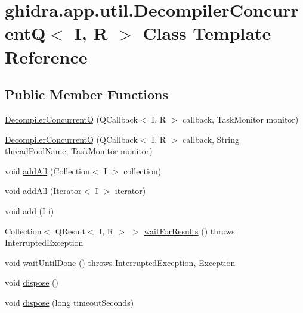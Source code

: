 \hypertarget{classghidra_1_1app_1_1util_1_1_decompiler_concurrent_q}{}\section{ghidra.\+app.\+util.\+Decompiler\+ConcurrentQ$<$ I, R $>$ Class Template Reference}
\label{classghidra_1_1app_1_1util_1_1_decompiler_concurrent_q}
\subsection*{Public Member Functions}
\begin{DoxyCompactItemize}
\item 
\mbox{\hyperlink{classghidra_1_1app_1_1util_1_1_decompiler_concurrent_q_a9e54e7889d280a864599fe641781565c}{Decompiler\+ConcurrentQ}} (Q\+Callback$<$ I, R $>$ callback, Task\+Monitor monitor)
\item 
\mbox{\hyperlink{classghidra_1_1app_1_1util_1_1_decompiler_concurrent_q_ac58082310c4a80a6b976ec8ba0265354}{Decompiler\+ConcurrentQ}} (Q\+Callback$<$ I, R $>$ callback, String thread\+Pool\+Name, Task\+Monitor monitor)
\item 
void \mbox{\hyperlink{classghidra_1_1app_1_1util_1_1_decompiler_concurrent_q_a4cbd1eb45068fd62baea390f86a56aee}{add\+All}} (Collection$<$ I $>$ collection)
\item 
void \mbox{\hyperlink{classghidra_1_1app_1_1util_1_1_decompiler_concurrent_q_ad6e5fbfe57c6eb842a9d3e4c8cda333d}{add\+All}} (Iterator$<$ I $>$ iterator)
\item 
void \mbox{\hyperlink{classghidra_1_1app_1_1util_1_1_decompiler_concurrent_q_a84e8c5e1b244aed19921a3fab510c31d}{add}} (I i)
\item 
Collection$<$ Q\+Result$<$ I, R $>$ $>$ \mbox{\hyperlink{classghidra_1_1app_1_1util_1_1_decompiler_concurrent_q_acf02756d2c1b9ab17c3871870601f76e}{wait\+For\+Results}} ()  throws Interrupted\+Exception 
\item 
void \mbox{\hyperlink{classghidra_1_1app_1_1util_1_1_decompiler_concurrent_q_a747c39c68ede4a3560e4b2e18a15905a}{wait\+Until\+Done}} ()  throws Interrupted\+Exception, Exception 
\item 
void \mbox{\hyperlink{classghidra_1_1app_1_1util_1_1_decompiler_concurrent_q_accb27b719bd48ed28ed813d36b84e98e}{dispose}} ()
\item 
void \mbox{\hyperlink{classghidra_1_1app_1_1util_1_1_decompiler_concurrent_q_ab09db6eaa044cf9126f06f7d0d36f35d}{dispose}} (long timeout\+Seconds)
\end{DoxyCompactItemize}


